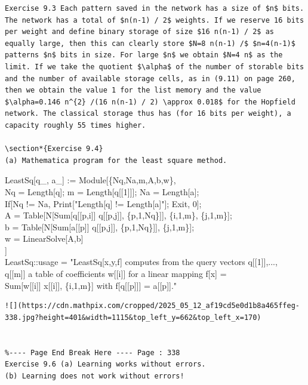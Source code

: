 \documentclass[10pt]{book}
\begin{document}
\begin{center}
\begin{enumerate}
\begin{center}
\begin{center}
\begin{center}
\begin{center}
\begin{center}
\begin{verbatim}
Exercise 9.3 Each pattern saved in the network has a size of $n$ bits. The network has a total of $n(n-1) / 2$ weights. If we reserve 16 bits per weight and define binary storage of size $16 n(n-1) / 2$ as equally large, then this can clearly store $N=8 n(n-1) /$ $n=4(n-1)$ patterns $n$ bits in size. For large $n$ we obtain $N=4 n$ as the limit. If we take the quotient $\alpha$ of the number of storable bits and the number of available storage cells, as in (9.11) on page 260, then we obtain the value 1 for the list memory and the value $\alpha=0.146 n^{2} /(16 n(n-1) / 2) \approx 0.018$ for the Hopfield network. The classical storage thus has (for 16 bits per weight), a capacity roughly 55 times higher.

\section*{Exercise 9.4}
(a) Mathematica program for the least square method.
\end{verbatim}


LeastSq[q\_, a\_] := Module[\{Nq,Na,m,A,b,w\},\\[0pt]
Nq = Length[q]; m = Length[q[[1]]]; Na = Length[a];\\[0pt]
If[Nq != Na, Print["Length[q] != Length[a]"]; Exit, 0];\\[0pt]
A = Table[N[Sum[q[[p,i]] q[[p,j]], \{p,1,Nq\}]], \{i,1,m\}, \{j,1,m\}];\\[0pt]
b = Table[N[Sum[a[[p]] q[[p,j]], \{p,1,Nq\}]], \{j,1,m\}];\\[0pt]
w = LinearSolve[A,b]\\[0pt]
]\\[0pt]
LeastSq::usage = "LeastSq[x,y,f] computes from the query vectors q[[1]],...,\\[0pt]
q[[m]] a table of coefficients w[[i]] for a linear mapping f[x] =\\[0pt]
Sum[w[[i]] x[[i]], \{i,1,m\}] with f[q[[p]]] = a[[p]]."

\begin{verbatim}
![](https://cdn.mathpix.com/cropped/2025_05_12_af19cd5e0d1b8a465ffeg-338.jpg?height=401&width=1115&top_left_y=662&top_left_x=170)


%---- Page End Break Here ---- Page : 338
Exercise 9.6 (a) Learning works without errors.
(b) Learning does not work without errors!


\end{verbatim}
\end{center}
\end{center}
\end{center}
\end{center}
\end{center}
\end{enumerate}
\end{center}
\end{document}
